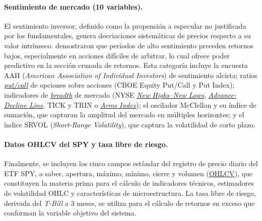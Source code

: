 \paragraph{Sentimiento de mercado (10 variables).}
El sentimiento inversor, definido como la propensi\'on a especular no justificada por los fundamentales, genera desviaciones sistem\'aticas de precios respecto a su valor intr\'inseco. \citet{baker2006} demostraron que per\'iodos de alto sentimiento preceden retornos bajos, especialmente en acciones dif\'iciles de arbitrar, lo cual ofrece poder predictivo en la secci\'on cruzada de retornos. Esta categor\'ia incluye la encuesta AAII (\textit{American Association of Individual Investors}) de sentimiento alcista; ratios \hyperlink{glos:put_call}{\textit{put/call}} de opciones sobre acciones (CBOE Equity Put/Call y Put Index); indicadores de \hyperlink{glos:breadth}{\textit{breadth}} de mercado (NYSE \hyperlink{glos:new_highs_lows}{\textit{New Highs--New Lows}}, \hyperlink{glos:advance_decline}{\textit{Advance-Decline Line}}, TICK y TRIN o \hyperlink{glos:tick_trin}{\textit{Arms Index}}); el oscilador McClellan y su \'indice de sumaci\'on, que capturan la amplitud del mercado en m\'ultiples horizontes; y el \'indice SRVOL (\textit{Short-Range Volatility}), que captura la volatilidad de corto plazo.

\paragraph{Datos OHLCV del SPY y tasa libre de riesgo.}
Finalmente, se incluyen los cinco campos est\'andar del registro de precio diario del ETF SPY, a saber, apertura, m\'aximo, m\'inimo, cierre y volumen (\hyperlink{glos:ohlcv}{OHLCV}), que constituyen la materia prima para el c\'alculo de indicadores t\'ecnicos, estimadores de volatilidad OHLC y caracter\'isticas de microestructura. La tasa libre de riesgo, derivada del \textit{T-Bill} a 3 meses, se utiliza para el c\'alculo de retornos en exceso que conforman la variable objetivo del sistema.
